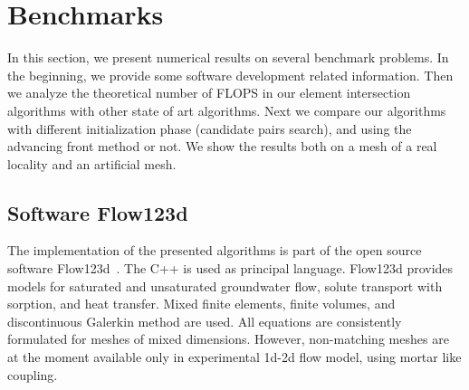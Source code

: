 % 





\section{Benchmarks}
\label{sec:benchmarks}

In this section, we present numerical results on several benchmark problems. 
In the beginning, we provide some software development related information.
Then we analyze the theoretical number of FLOPS in our element intersection algorithms with 
other state of art algorithms.
Next we compare our algorithms with different initialization phase (candidate pairs search),
and using the advancing front method or not. We show the results both on a mesh of a real locality
and an artificial mesh.


\subsection{Software Flow123d}
The implementation of the presented algorithms is part of the open source software Flow123d~\cite{flow123d}.
The C++ is used as principal language. Flow123d provides models for saturated and unsaturated groundwater flow,
solute transport with sorption, and  heat transfer. Mixed finite elements, finite volumes, and discontinuous Galerkin method are 
used. All equations are consistently formulated for meshes of mixed dimensions.  However,
non-matching meshes are at the moment available only in experimental 1d-2d flow model, using mortar like coupling.

